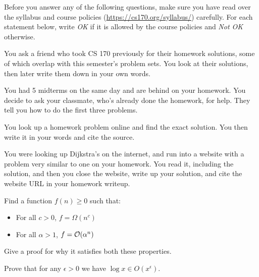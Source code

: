 \documentclass{article}
\begin{document}

Before you answer any of the following questions, make sure you have read over the syllabus and course policies (\url{https://cs170.org/syllabus/}) carefully.
For each statement below, write \textit{OK} if it is allowed by the course policies and \textit{Not OK} otherwise.

\begin{subparts}
\subpart You ask a friend who took CS 170 previously for their homework solutions, 
some of which overlap with this semester's problem sets. 
You look at their solutions, then later write them down in your own words.

\subpart You had 5 midterms on the same day and are behind on your homework. 
You decide to ask your classmate, who's already done the homework, for help. 
They tell you how to do the first three problems.

\subpart You look up a homework problem online and find the exact solution. 
You then write it in your words and cite the source.

\subpart You were looking up Dijkstra's on the internet, and run into a website with a problem very similar to one on your homework. 
You read it, including the solution, and then you close the website, 
write up your solution, and cite the website URL in your homework writeup.

\end{subparts}


Find a function $f(n) \geq 0$ such that:

\begin{itemize}
    \item For all $c > 0$, $f = \Omega(n^c)$
    \item For all $\alpha > 1$, $f = \mathcal{O}(\alpha^n)$
\end{itemize}

\noindent Give a proof for why it satisfies both these properties. \\


Prove that for any $\epsilon>0$ we have $\log x \in O(x^\epsilon)$.
	
\end{document}
